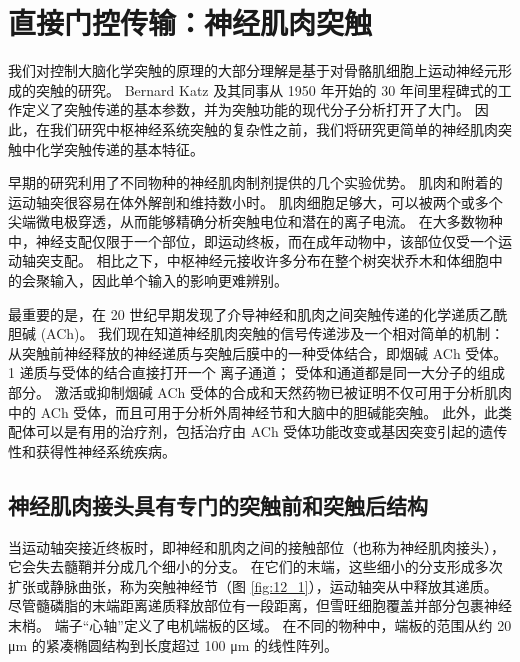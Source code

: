 \chapter{直接门控传输：神经肌肉突触} \label{chap:chap12}

我们对控制大脑化学突触的原理的大部分理解是基于对骨骼肌细胞上运动神经元形成的突触的研究。 
Bernard Katz 及其同事从 1950 年开始的 30 年间里程碑式的工作定义了突触传递的基本参数，并为突触功能的现代分子分析打开了大门。 
因此，在我们研究中枢神经系统突触的复杂性之前，我们将研究更简单的神经肌肉突触中化学突触传递的基本特征。


早期的研究利用了不同物种的神经肌肉制剂提供的几个实验优势。 
肌肉和附着的运动轴突很容易在体外解剖和维持数小时。 
肌肉细胞足够大，可以被两个或多个尖端微电极穿透，从而能够精确分析突触电位和潜在的离子电流。 
在大多数物种中，神经支配仅限于一个部位，即运动终板，而在成年动物中，该部位仅受一个运动轴突支配。 
相比之下，中枢神经元接收许多分布在整个树突状乔木和体细胞中的会聚输入，因此单个输入的影响更难辨别。


最重要的是，在 20 世纪早期发现了介导神经和肌肉之间突触传递的化学递质乙酰胆碱 (ACh)。 
我们现在知道神经肌肉突触的信号传递涉及一个相对简单的机制：从突触前神经释放的神经递质与突触后膜中的一种受体结合，即烟碱 ACh 受体。
1 递质与受体的结合直接打开一个 离子通道； 受体和通道都是同一大分子的组成部分。 
激活或抑制烟碱 ACh 受体的合成和天然药物已被证明不仅可用于分析肌肉中的 ACh 受体，而且可用于分析外周神经节和大脑中的胆碱能突触。 
此外，此类配体可以是有用的治疗剂，包括治疗由 ACh 受体功能改变或基因突变引起的遗传性和获得性神经系统疾病。


\section{神经肌肉接头具有专门的突触前和突触后结构}

当运动轴突接近终板时，即神经和肌肉之间的接触部位（也称为神经肌肉接头），它会失去髓鞘并分成几个细小的分支。 
在它们的末端，这些细小的分支形成多次扩张或静脉曲张，称为突触神经节（图 \ref{fig:12_1}），运动轴突从中释放其递质。 
尽管髓磷脂的末端距离递质释放部位有一段距离，但雪旺细胞覆盖并部分包裹神经末梢。 
端子“心轴”定义了电机端板的区域。 
在不同的物种中，端板的范围从约 20 μm 的紧凑椭圆结构到长度超过 100 μm 的线性阵列。

